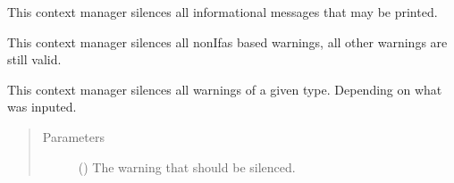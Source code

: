 \documentclass[letterpaper,10pt,english]{sphinxmanual}
\begin{document}

\begin{fulllineitems}
\label{\detokenize{docstrings/ifa_smeargle.core.error:ifa_smeargle.core.error.ifas_silence_info_message}}
This context manager silences all informational messages
that may be printed.

\end{fulllineitems}


\begin{fulllineitems}
\label{\detokenize{docstrings/ifa_smeargle.core.error:ifa_smeargle.core.error.ifas_silence_nonifas_warnings}}
This context manager silences all non\sphinxhyphen{}Ifas based warnings,
all other warnings are still valid.

\end{fulllineitems}


\begin{fulllineitems}
\label{\detokenize{docstrings/ifa_smeargle.core.error:ifa_smeargle.core.error.ifas_silence_specific_warnings}}
This context manager silences all warnings of a given type.
Depending on what was inputed.
\begin{quote}\begin{description}
\item[{Parameters}] \leavevmode
{} () \textendash{} The warning that should be silenced.

\end{description}\end{quote}

\end{fulllineitems}
\end{document}
